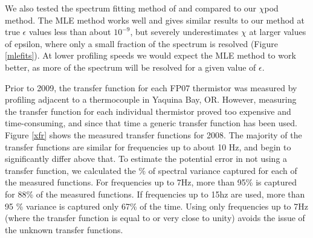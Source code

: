 \documentclass{ametsoc}
\begin{document}

%
%


\appendix[B]


We also tested the spectrum fitting method of \cite{ruddicketal00} and compared to our $\chi$pod method. The MLE method works well and gives similar results to our method at true $\epsilon$ values less than about $10^{-9}$, but severely underestimates $\chi$ at larger values of epsilon, where only a small fraction of the spectrum is resolved (Figure \ref{mlefits}). At lower profiling speeds we would expect the MLE method to work better, as more of the spectrum will be resolved for a given value of $\epsilon$.


\appendix[C]



Prior to 2009, the transfer function for each FP07 thermistor was measured by profiling adjacent to a thermocouple in Yaquina Bay, OR. However, measuring the transfer function for each individual thermistor proved too expensive and time-consuming, and since that time a generic transfer function has been used. Figure \ref{xfr} shows the measured transfer functions for 2008. The majority of the transfer functions are similar for frequencies up to about 10 Hz, and begin to significantly differ above that. To estimate the potential error in not using a transfer function, we calculated the $\%$ of spectral variance captured for each of the measured functions. For frequencies up to 7Hz, more than 95\% is captured for 88\% of the measured functions. If frequencies up to 15hz are used, more than 95 \% variance is captured only 67\% of the time. Using only frequencies up to 7Hz (where the transfer function is equal to or very close to unity) avoids the issue of the unknown transfer functions.
\end{document}
